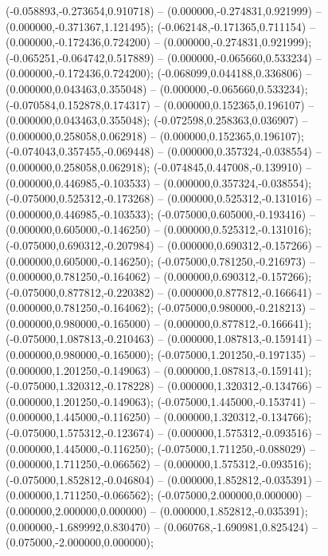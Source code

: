  (-0.058893,-0.273654,0.910718) -- (0.000000,-0.274831,0.921999) -- (0.000000,-0.371367,1.121495);
 (-0.062148,-0.171365,0.711154) -- (0.000000,-0.172436,0.724200) -- (0.000000,-0.274831,0.921999);
 (-0.065251,-0.064742,0.517889) -- (0.000000,-0.065660,0.533234) -- (0.000000,-0.172436,0.724200);
 (-0.068099,0.044188,0.336806) -- (0.000000,0.043463,0.355048) -- (0.000000,-0.065660,0.533234);
 (-0.070584,0.152878,0.174317) -- (0.000000,0.152365,0.196107) -- (0.000000,0.043463,0.355048);
 (-0.072598,0.258363,0.036907) -- (0.000000,0.258058,0.062918) -- (0.000000,0.152365,0.196107);
 (-0.074043,0.357455,-0.069448) -- (0.000000,0.357324,-0.038554) -- (0.000000,0.258058,0.062918);
 (-0.074845,0.447008,-0.139910) -- (0.000000,0.446985,-0.103533) -- (0.000000,0.357324,-0.038554);
 (-0.075000,0.525312,-0.173268) -- (0.000000,0.525312,-0.131016) -- (0.000000,0.446985,-0.103533);
 (-0.075000,0.605000,-0.193416) -- (0.000000,0.605000,-0.146250) -- (0.000000,0.525312,-0.131016);
 (-0.075000,0.690312,-0.207984) -- (0.000000,0.690312,-0.157266) -- (0.000000,0.605000,-0.146250);
 (-0.075000,0.781250,-0.216973) -- (0.000000,0.781250,-0.164062) -- (0.000000,0.690312,-0.157266);
 (-0.075000,0.877812,-0.220382) -- (0.000000,0.877812,-0.166641) -- (0.000000,0.781250,-0.164062);
 (-0.075000,0.980000,-0.218213) -- (0.000000,0.980000,-0.165000) -- (0.000000,0.877812,-0.166641);
 (-0.075000,1.087813,-0.210463) -- (0.000000,1.087813,-0.159141) -- (0.000000,0.980000,-0.165000);
 (-0.075000,1.201250,-0.197135) -- (0.000000,1.201250,-0.149063) -- (0.000000,1.087813,-0.159141);
 (-0.075000,1.320312,-0.178228) -- (0.000000,1.320312,-0.134766) -- (0.000000,1.201250,-0.149063);
 (-0.075000,1.445000,-0.153741) -- (0.000000,1.445000,-0.116250) -- (0.000000,1.320312,-0.134766);
 (-0.075000,1.575312,-0.123674) -- (0.000000,1.575312,-0.093516) -- (0.000000,1.445000,-0.116250);
 (-0.075000,1.711250,-0.088029) -- (0.000000,1.711250,-0.066562) -- (0.000000,1.575312,-0.093516);
 (-0.075000,1.852812,-0.046804) -- (0.000000,1.852812,-0.035391) -- (0.000000,1.711250,-0.066562);
 (-0.075000,2.000000,0.000000) -- (0.000000,2.000000,0.000000) -- (0.000000,1.852812,-0.035391);
 (0.000000,-1.689992,0.830470) -- (0.060768,-1.690981,0.825424) -- (0.075000,-2.000000,0.000000);
